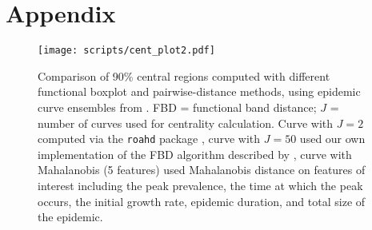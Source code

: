 \documentclass[12pt]{article}
\theoremstyle{definition} %
\begin{document}
\section*{Appendix}

\begin{figure}[ht]\centering
  \texttt{[image: scripts/cent\_plot2.pdf]}
  \caption{Comparison of 90\% central regions computed with
    different functional boxplot and pairwise-distance methods, using epidemic curve ensembles from \juul. FBD = functional band distance; $J$ = number of curves used for centrality calculation. Curve with $J=2$ computed via the \texttt{roahd} package \citep{roahd}, curve with $J=50$ used our own implementation of the FBD algorithm described by \juul, curve with Mahalanobis (5 features) used Mahalanobis distance on features of interest including the peak prevalence, the time at which the peak occurs, the initial growth rate, epidemic duration, and total size of the epidemic.
  }
  \label{p.b}
\end{figure}
\end{document}
